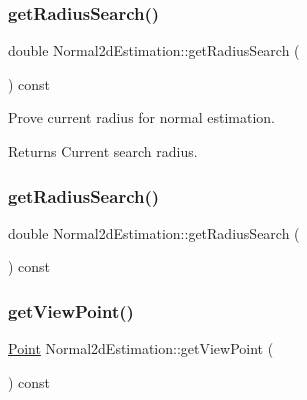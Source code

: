\mbox{\label{classNormal2dEstimation_a2b25a3efe493da9995622279e3a21437}} 
\subsubsection{\texorpdfstring{get\+Radius\+Search()}{getRadiusSearch()}\hspace{0.1cm}{\footnotesize\ttfamily [1/2]}}
{\footnotesize\ttfamily double Normal2d\+Estimation\+::get\+Radius\+Search (\begin{DoxyParamCaption}{ }\end{DoxyParamCaption}) const\hspace{0.3cm}{\ttfamily [inline]}}



Prove current radius for normal estimation. 

\begin{DoxyReturn}{Returns}
Current search radius. 
\end{DoxyReturn}
\mbox{\label{classNormal2dEstimation_a2b25a3efe493da9995622279e3a21437}} 
\subsubsection{\texorpdfstring{get\+Radius\+Search()}{getRadiusSearch()}\hspace{0.1cm}{\footnotesize\ttfamily [2/2]}}
{\footnotesize\ttfamily double Normal2d\+Estimation\+::get\+Radius\+Search (\begin{DoxyParamCaption}{ }\end{DoxyParamCaption}) const\hspace{0.3cm}{\ttfamily [inline]}}

\mbox{\label{classNormal2dEstimation_a9a8b5ac0f03023a476f7986cf06c8f96}} 
\subsubsection{\texorpdfstring{get\+View\+Point()}{getViewPoint()}\hspace{0.1cm}{\footnotesize\ttfamily [1/2]}}
{\footnotesize\ttfamily \hyperlink{Normal2dEstimation_8h_ab8d898f36957cca40634530a6f118a3e}{Point} Normal2d\+Estimation\+::get\+View\+Point (\begin{DoxyParamCaption}{ }\end{DoxyParamCaption}) const\hspace{0.3cm}{\ttfamily [inline]}}



